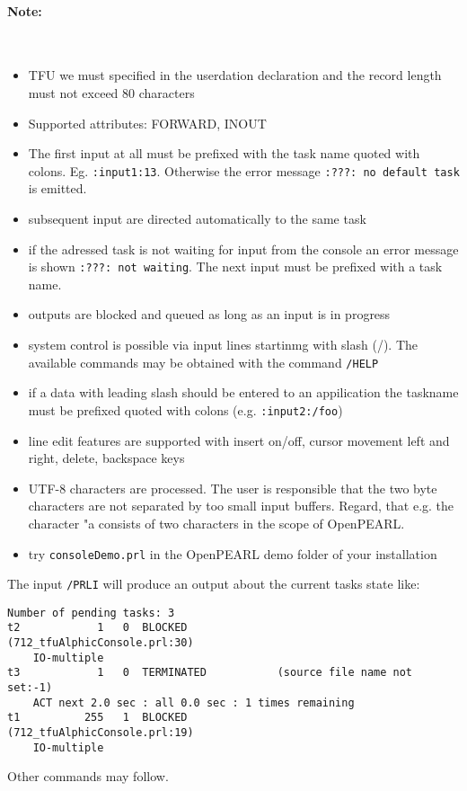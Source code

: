 \paragraph{Note:}\ 
\begin{itemize}
\item  TFU we must specified in the userdation declaration
and the record length must not exceed 80 characters
\item Supported attributes: FORWARD, INOUT
\item The first input at all must be prefixed with the task name
 quoted with colons. Eg. \verb|:input1:13|. Otherwise the error message
 \verb|:???: no default task| is emitted.
\item subsequent input are directed automatically to the same task
\item if the adressed task is not waiting for input from the console an
  error message is shown \verb|:???: not waiting|. The next input must be 
  prefixed with a task name.
\item outputs are blocked and queued as long as an input is in progress
\item system control is possible via input lines startinmg with slash (/).
  The available commands may be obtained with the command \verb|/HELP|
\item if a data with leading slash should  be entered to an appilication
   the taskname must be prefixed quoted with colons (e.g. \verb|:input2:/foo|)
\item line edit features are supported with 
   insert on/off, cursor movement left and right, delete, backspace keys
\item UTF-8 characters are processed. The user is responsible that 
   the two byte characters are not separated by too small input buffers.
   Regard, that e.g. the character "a consists of  two characters in the 
   scope of OpenPEARL.
\item try \verb|consoleDemo.prl|  in the OpenPEARL demo folder of your installation
\end{itemize}
The input \texttt{/PRLI} will produce an output about the current 
tasks state like:
\begin{verbatim}
Number of pending tasks: 3
t2            1   0  BLOCKED              (712_tfuAlphicConsole.prl:30)
	IO-multiple
t3            1   0  TERMINATED           (source file name not set:-1)
	ACT next 2.0 sec : all 0.0 sec : 1 times remaining
t1          255   1  BLOCKED              (712_tfuAlphicConsole.prl:19)
	IO-multiple
\end{verbatim}
Other commands may follow.

